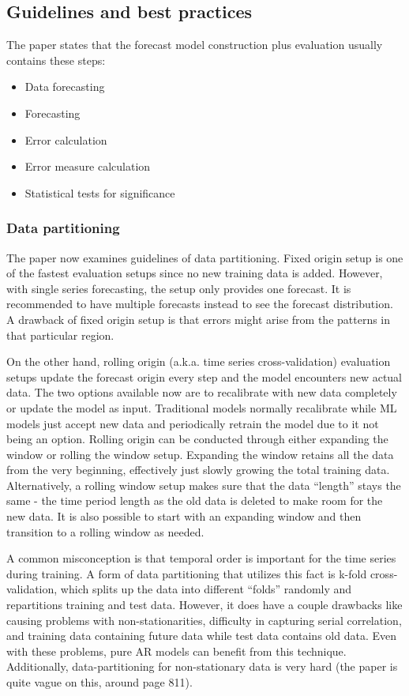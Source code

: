\documentclass[12pt]{article}
\begin{document}
\subsection{Guidelines and best practices}
The paper states that the forecast model construction plus evaluation usually contains these steps:
\begin{itemize}
    \item Data forecasting
    \item Forecasting
    \item Error calculation
    \item Error measure calculation
    \item Statistical tests for significance
\end{itemize}

\subsubsection{Data partitioning}
The paper now examines guidelines of data partitioning. Fixed origin setup is one of the fastest evaluation setups since no new training data is added. However, with single series forecasting, the setup only provides one forecast. It is recommended to have multiple forecasts instead to see the forecast distribution. A drawback of fixed origin setup is that errors might arise from the patterns in that particular region. 

On the other hand, rolling origin (a.k.a. time series cross-validation) evaluation setups update the forecast origin every step and the model encounters new actual data. The two options available now are to recalibrate with new data completely or update the model as input. Traditional models normally recalibrate while ML models just accept new data and periodically retrain the model due to it not being an option. Rolling origin can be conducted through either expanding the window or rolling the window setup. Expanding the window retains all the data from the very beginning, effectively just slowly growing the total training data. Alternatively, a rolling window setup makes sure that the data ``length'' stays the same - the time period length as the old data is deleted to make room for the new data. It is also possible to start with an expanding window and then transition to a rolling window as needed.

A common misconception is that temporal order is important for the time series during training. A form of data partitioning that utilizes this fact is k-fold cross-validation, which splits up the data into different ``folds'' randomly and repartitions training and test data. However, it does have a couple drawbacks like causing problems with non-stationarities, difficulty in capturing serial correlation, and training data containing future data while test data contains old data. Even with these problems, pure AR models can benefit from this technique. Additionally, data-partitioning for non-stationary data is very hard (the paper is quite vague on this, around page 811). 
\end{document}
